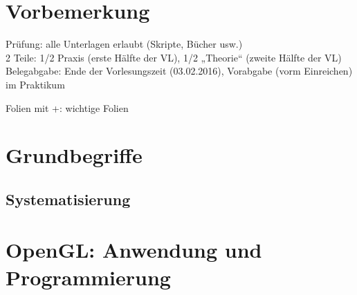 \newcommand{\customDir}{../}








%



\maketitle
\newpage
\tableofcontents
\newpage

\chapter*{Vorbemerkung}
Prüfung: alle Unterlagen erlaubt (Skripte, Bücher usw.)\\
2 Teile: 1/2 Praxis (erste Hälfte der VL), 1/2 „Theorie“ (zweite Hälfte der VL)\\
Belegabgabe: Ende der Vorlesungszeit (03.02.2016), Vorabgabe (vorm Einreichen) im Praktikum

Folien mit +: wichtige Folien
\chapter*{Grundbegriffe}
\section*{Systematisierung}

\chapter{OpenGL: Anwendung und Programmierung}
